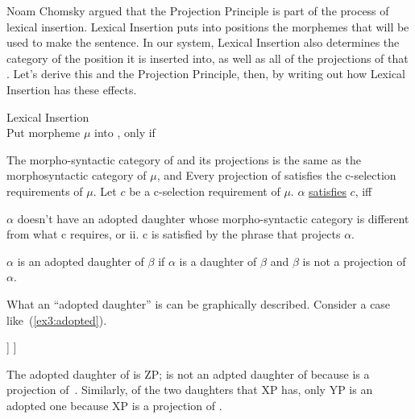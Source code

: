 Noam Chomsky\cite{Chomsky:1965} argued that the Projection Principle is part of the process of lexical insertion. Lexical Insertion puts into  positions the morphemes that will be used to make the sentence. In our system, Lexical Insertion also determines the category of the  position it is inserted into, as well as all of the projections of that . Let's derive this and the Projection Principle, then, by writing out how Lexical Insertion has these effects.
\pagebreak
\begin{exe}
	\raggedright
	\ex \label{ex3:LI} Lexical Insertion\\
	Put morpheme $\mu$ into , only if
	\begin{xlist}
		\ex The morpho-syntactic category of  and its projections is the same as the morphosyntactic category of $\mu$, and
		\ex Every projection of  satisfies the c-selection requirements of $\mu$.
		\sn Let $c$ be a c-selection requirement of $\mu$. $\alpha$ \underline{satisfies} $c$, iff
		\begin{xlist}
			\ex $\alpha$ doesn't have an adopted daughter whose morpho-syntactic category is different from what c requires, or ii. 
			\ex c is satisfied by the phrase that projects $\alpha$.
		\end{xlist}
		\sn $\alpha$ is an adopted daughter of $\beta$ if $\alpha$ is a daughter of $\beta$ and $\beta$ is not a projection of~$\alpha$.
		\end{xlist}
\end{exe}
What an ``adopted daughter'' is can be graphically described. Consider a case like~(\ref{ex3:adopted}).
\begin{exe}
\raggedright
	\ex \label{ex3:adopted}
	\begin{forest}
	[XP
		[YP ]
		[\ibar{X}
			[\obar{X} ]
			[ZP ]
		 ]
	]
	\end{forest}
\end{exe}
The adopted daughter of  is ZP;  is not an adpted daughter of  because  is a projection of~. Similarly, of the two daughters that XP has, only YP is an adopted one because XP is a projection of .

